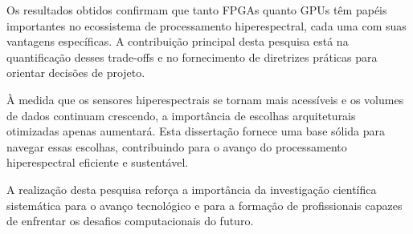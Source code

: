 Os resultados obtidos confirmam que tanto FPGAs quanto GPUs têm papéis importantes no ecossistema de processamento hiperespectral, cada uma com suas vantagens específicas. A contribuição principal desta pesquisa está na quantificação desses trade-offs e no fornecimento de diretrizes práticas para orientar decisões de projeto.

À medida que os sensores hiperespectrais se tornam mais acessíveis e os volumes de dados continuam crescendo, a importância de escolhas arquiteturais otimizadas apenas aumentará. Esta dissertação fornece uma base sólida para navegar essas escolhas, contribuindo para o avanço do processamento hiperespectral eficiente e sustentável.

A realização desta pesquisa reforça a importância da investigação científica sistemática para o avanço tecnológico e para a formação de profissionais capazes de enfrentar os desafios computacionais do futuro.